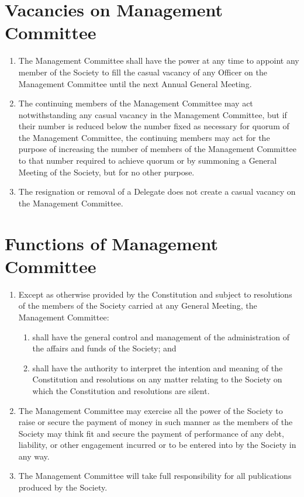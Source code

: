 \documentclass[a4paper]{article}
\begin{document}
\section{Vacancies on Management Committee}
\begin{enumerate}
\item The Management Committee shall have the power at any time to appoint any member of the Society to fill the casual vacancy of any Officer on the Management Committee until the next Annual General Meeting.
\item The continuing members of the Management Committee may act notwithstanding any casual vacancy in the Management Committee, but if their number is reduced below the number fixed as necessary for quorum of the Management Committee, the continuing members may act for the purpose of increasing the number of members of the Management Committee to that number required to achieve quorum or by summoning a General Meeting of the Society, but for no other purpose.
\item The resignation or removal of a Delegate does not create a casual vacancy on the Management Committee.
\end{enumerate}

\section{Functions of Management Committee}
\begin{enumerate}
\item Except as otherwise provided by the Constitution and subject to resolutions of the members of the Society carried at any General Meeting, the Management Committee:
	\begin{enumerate}
	\item shall have the general control and management of the administration of the affairs and funds of the Society; and
	\item shall have the authority to interpret the intention and meaning of the Constitution and resolutions on any matter relating to the Society on which the Constitution and resolutions are silent.
	\end{enumerate}
\item The Management Committee may exercise all the power of the Society to raise or secure the payment of money in such manner as the members of the Society may think fit and secure the payment of performance of any debt, liability, or other engagement incurred or to be entered into by the Society in any way.
\item The Management Committee will take full responsibility for all publications produced by the Society.
\end{enumerate}
\end{document}
